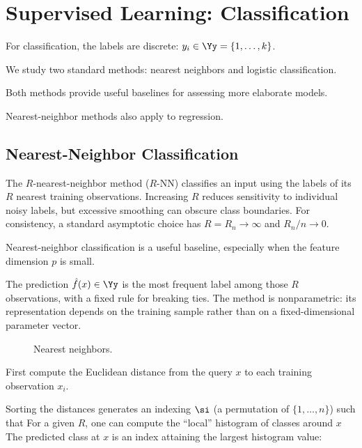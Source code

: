 \section{Supervised Learning: Classification}
\label{sec-classif}

For classification, the labels are discrete: $y_i \in \Yy = \{1,\ldots,k\}$.
 
We study two standard methods: nearest neighbors and logistic classification.
 
Both methods provide useful baselines for assessing more elaborate models.
 
Nearest-neighbor methods also apply to regression.

                                                                                                            
\subsection{Nearest-Neighbor Classification}
\label{sec-nn-classif}

The $R$-nearest-neighbor method ($R$-NN) classifies an input using the labels of its $R$ nearest training observations. Increasing $R$ reduces sensitivity to individual noisy labels, but excessive smoothing can obscure class boundaries. For consistency, a standard asymptotic choice has $R=R_n\to\infty$ and $R_n/n\to0$.
 
Nearest-neighbor classification is a useful baseline, especially when the feature dimension $p$ is small.

The prediction $\hat f(x)\in\Yy$ is the most frequent label among those $R$ observations, with a fixed rule for breaking ties. The method is nonparametric: its representation depends on the training sample rather than on a fixed-dimensional parameter vector.

\begin{figure}[tbp]
\centering
{}
\caption{Nearest neighbors.}
\label{fig-review-ml-nearest-neighbors}
\end{figure}
First compute the Euclidean distance from the query $x$ to each training observation $x_i$.
 
Sorting the distances generates an indexing $\si$ (a permutation of $\{1,\ldots,n\}$) such that 
For a given $R$, one can compute the ``local'' histogram of classes around $x$
The predicted class at $x$ is an index attaining the largest histogram value:

